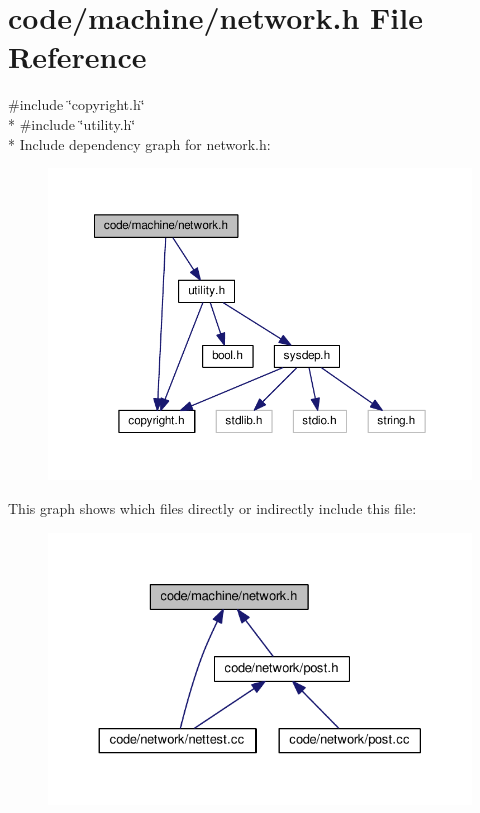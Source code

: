 \section{code/machine/network.h File Reference}
\label{network_8h}
{\ttfamily \#include \char`\"{}copyright.\+h\char`\"{}}\\*
{\ttfamily \#include \char`\"{}utility.\+h\char`\"{}}\\*
Include dependency graph for network.\+h\+:
\nopagebreak
\begin{figure}[H]
\begin{center}
\leavevmode
\includegraphics[width=350pt]{network_8h__incl}
\end{center}
\end{figure}
This graph shows which files directly or indirectly include this file\+:
\nopagebreak
\begin{figure}[H]
\begin{center}
\leavevmode
\includegraphics[width=330pt]{network_8h__dep__incl}
\end{center}
\end{figure}
